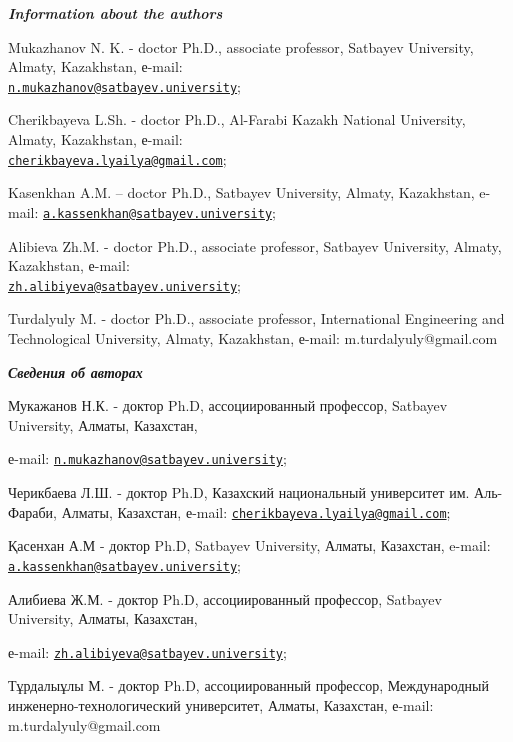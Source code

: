 \begin{authorinfo}
\hspace{1em}\emph{{\bfseries Information about the authors}}

Mukazhanov N. K. - doctor Ph.D., associate professor, Satbayev
University, Almaty, Kazakhstan, е-mail:
\\\href{mailto:n.mukazhanov@satbayev.university}{\nolinkurl{n.mukazhanov@satbayev.university}};

Cherikbayeva L.Sh. - doctor Ph.D., Al-Farabi Kazakh National University,
Almaty, Kazakhstan, е-mail:
\\\href{mailto:cherikbayeva.lyailya@gmail.com}{\nolinkurl{cherikbayeva.lyailya@gmail.com}};

Kasenkhan A.M. -- doctor Ph.D., Satbayev University, Almaty, Kazakhstan,
e-mail:
\href{mailto:a.kassenkhan@satbayev.university}{\nolinkurl{a.kassenkhan@satbayev.university}};

Alibieva Zh.M. - doctor Ph.D., associate professor, Satbayev University,
Almaty, Kazakhstan, е-mail:
\\\href{mailto:zh.alibiyeva@satbayev.university}{\nolinkurl{zh.alibiyeva@satbayev.university}};

Turdalyuly M. - doctor Ph.D., associate professor, International
Engineering and Technological University, Almaty, Kazakhstan, е-mail:
m.turdalyuly@gmail.com

\hspace{1em}\emph{{\bfseries Сведения об авторах}}

Мукажанов Н.К. - доктор Ph.D, ассоциированный профессор, Satbayev
University, Алматы, Казахстан, 

е-mail:
\href{mailto:n.mukazhanov@satbayev.university}{\nolinkurl{n.mukazhanov@satbayev.university}};

Черикбаева Л.Ш. - доктор Ph.D, Казахский национальный университет им.
Аль-Фараби, Алматы, Казахстан, е-mail:
\href{mailto:cherikbayeva.lyailya@gmail.com}{\nolinkurl{cherikbayeva.lyailya@gmail.com}};

Қасенхан А.М - доктор Ph.D, Satbayev University, Алматы, Казахстан,
e-mail:
\href{mailto:a.kassenkhan@satbayev.university}{\nolinkurl{a.kassenkhan@satbayev.university}};

Алибиева Ж.М. - доктор Ph.D, ассоциированный профессор, Satbayev
University, Алматы, Казахстан, 

е-mail:
\href{mailto:zh.alibiyeva@satbayev.university}{\nolinkurl{zh.alibiyeva@satbayev.university}};

Тұрдалыұлы М. - доктор Ph.D, ассоциированный профессор, Международный
инженерно-технологический университет, Алматы, Казахстан, е-mail:
m.turdalyuly@gmail.com
\end{authorinfo}
